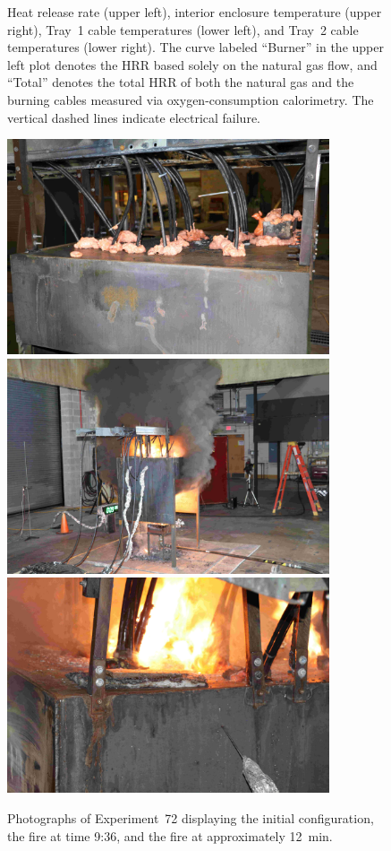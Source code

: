 \begin{figure}[H]
\caption[HRR and temperatures of Experiment 72]{Heat release rate (upper left), interior enclosure temperature (upper right), Tray~1 cable temperatures (lower left), and Tray~2 cable temperatures (lower right). The curve labeled ``Burner'' in the upper left plot denotes the HRR based solely on the natural gas flow, and ``Total'' denotes the total HRR of both the natural gas and the burning cables measured via oxygen-consumption calorimetry. The vertical dashed lines indicate electrical failure.}
\label{fig:Test_72}
\end{figure}

\begin{figure}[p]
\centering
\includegraphics[height=2.50in]{../FIGURES/Test_72_Photo_1} \\ \vspace{0.1in}
\includegraphics[height=2.50in]{../FIGURES/Test_72_Photo_2} \\ \vspace{0.1in}
\includegraphics[height=2.50in]{../FIGURES/Test_72_Photo_3}
\caption[Photographs of Experiment~72]{Photographs of Experiment~72 displaying the initial configuration, the fire at time 9:36, and the fire at approximately 12~min.}
\label{fig:Test_72_photos}
\end{figure}


